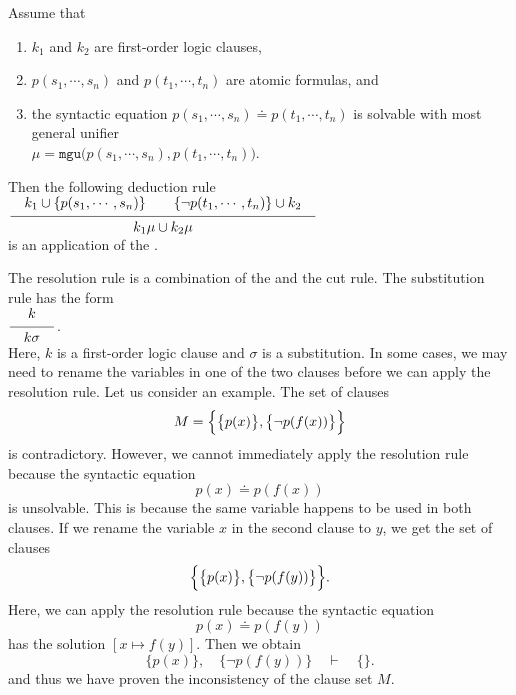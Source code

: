 \begin{Definition}  
    Assume that
    \begin{enumerate}
    \item $k_1$ and $k_2$ are first-order logic clauses,
    \item $p(s_1,\cdots,s_n)$ and $p(t_1,\cdots,t_n)$ are atomic formulas, and
    \item the syntactic equation $p(s_1,\cdots,s_n) \doteq p(t_1,\cdots,t_n)$ is solvable with most general unifier
          \\[0.2cm]
          \hspace*{1.3cm}
          $\mu = \mathtt{mgu}\bigl(p(s_1,\cdots,s_n), p(t_1,\cdots,t_n)\bigr)$. 
    \end{enumerate}
     Then the following deduction rule
     \\[0.2cm]
     \hspace*{1.3cm}
     $\schluss{k_1 \cup\{ p(s_1,\cdots,s_n)\} \quad\quad \{\neg p(t_1,\cdots,t_n)\} \cup k_2}{
                 k_1\mu \cup k_2\mu} 
               $
     \\[0.2cm]
     is an application of the .
     \eox
\end{Definition}

The resolution rule is a combination of the  and the cut rule. The substitution rule  has the form
\\[0.2cm]
\hspace*{1.3cm}
$\schluss{k}{k\sigma}$.
\\[0.2cm]
Here, $k$ is a first-order logic clause and $\sigma$ is a substitution.
In some cases, we may need to rename the variables in one of the two clauses before we can apply the resolution rule. Let us consider an example.
The set of clauses
\[ M = \Bigl\{ \bigl\{ p(x) \bigr\}, \bigl\{ \neg p(f(x)) \bigr\} \Bigr\} \]
is contradictory. However, we cannot immediately apply the resolution rule because the syntactic equation
\[ p(x) \doteq p(f(x)) \]
is unsolvable. This is because the same variable happens to be used in both clauses. If we rename the variable $x$ in the second clause to $y$, we get the set of clauses
\[ \Bigl\{ \bigl\{ p(x) \bigr\}, \bigl\{ \neg p(f(y)) \bigr\} \Bigr\}. \]
Here, we can apply the resolution rule because the syntactic equation
\[ p(x) \doteq p(f(y)) \]
has the solution $[x \mapsto f(y)]$. Then we obtain
\[ \bigl\{ p(x) \bigr\}, \quad \bigl\{ \neg p(f(y)) \bigr\} \quad \vdash \quad \{\}. \]
and thus we have proven the inconsistency of the clause set $M$.


